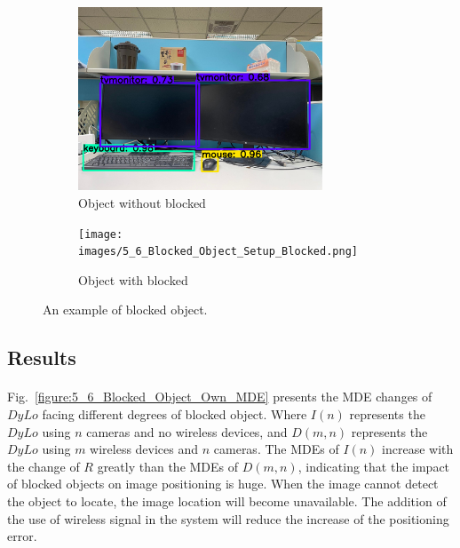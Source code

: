 \documentclass[a4paper,12pt]{report}
\begin{document}
\begin{figure}[tbph]%
    \begin{subfigure}{1\linewidth}
    \centering
        \includegraphics[width=0.8\textwidth]{images/5_6_Blocked_Object_Setup_Original.png}
        \caption{Object without blocked}
        \label{figure:5_6_Blocked_Object_Setup_Original}
    \end{subfigure}
    \begin{subfigure}{1\linewidth}
    \centering
        \texttt{[image: images/5\_6\_Blocked\_Object\_Setup\_Blocked.png]}
        \caption{Object with blocked}
        \label{figure:5_6_Blocked_Object_Setup_Blocked}
    \end{subfigure}
\caption{An example of blocked object.}
\label{figure:5_6_Blocked_Object_Setup}
\end{figure}


\subsection{Results}

\paragraph{}
Fig.~\ref{figure:5_6_Blocked_Object_Own_MDE} presents the MDE changes of $DyLo$ facing different degrees of blocked object. Where $I(n)$ represents the $DyLo$ using $n$ cameras and no wireless devices, and $D(m,n)$ represents the $DyLo$ using $m$ wireless devices and $n$ cameras. The MDEs of $I(n)$ increase with the change of $R$ greatly than the MDEs of $D(m,n)$, indicating that the impact of blocked objects on image positioning is huge. When the image cannot detect the object to locate, the image location will become unavailable. The addition of the use of wireless signal in the system will reduce the increase of the positioning error.
\end{document}
